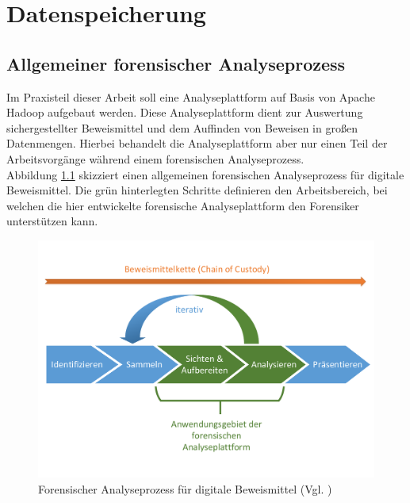 \chapter{Datenspeicherung}
\label{ch:data_persistence}

\section{Allgemeiner forensischer Analyseprozess}
\label{sec:common_analysis_process}
Im Praxisteil dieser Arbeit soll eine Analyseplattform auf Basis von Apache Hadoop aufgebaut werden. Diese Analyseplattform dient zur Auswertung sichergestellter Beweismittel und dem Auffinden von Beweisen in großen Datenmengen. Hierbei behandelt die Analyseplattform aber nur einen Teil der Arbeitsvorgänge während einem forensischen Analyseprozess.\\

\noindent
Abbildung \ref{fig:digital_forensics_process} skizziert einen allgemeinen forensischen Analyseprozess für digitale Beweismittel.\cite[S.16]{digital_forensics} Die grün hinterlegten Schritte definieren den Arbeitsbereich, bei welchen die hier entwickelte forensische Analyseplattform den Forensiker unterstützen kann.\\ 
\begin{figure}[ht]
  \centering
  \includegraphics[width=\textwidth]{./resource/digital_forensics_process.pdf}
  \caption{Forensischer Analyseprozess für digitale Beweismittel (Vgl. \cite[S.16]{digital_forensics})}
  \label{fig:digital_forensics_process}
\end{figure}


